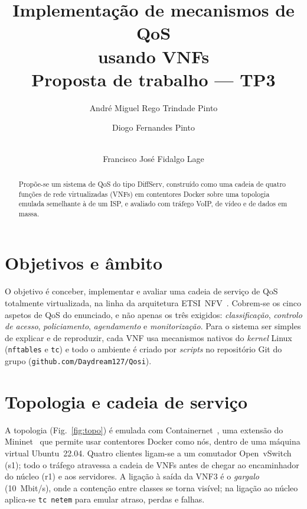 \documentclass[a4paper]{llncs}
\begin{document}
\title{Implementação de mecanismos de QoS\\ usando VNFs\\{\large Proposta de trabalho --- TP3}}

\author{André Miguel Rego Trindade Pinto \and Diogo Fernandes Pinto \and\\ Francisco José Fidalgo Lage}


\maketitle

\begin{abstract}
Propõe-se um sistema de QoS do tipo DiffServ, construído como uma cadeia de quatro
funções de rede virtualizadas (VNFs) em contentores Docker sobre uma topologia emulada
semelhante à de um ISP, e avaliado com tráfego VoIP, de vídeo e de dados em massa.
\end{abstract}

\section{Objetivos e âmbito}

O objetivo é conceber, implementar e avaliar uma cadeia de serviço de QoS totalmente
virtualizada, na linha da arquitetura ETSI~NFV~\cite{etsi-nfv}. Cobrem-se os cinco
aspetos de QoS do enunciado, e não apenas os três exigidos: \emph{classificação},
\emph{controlo de acesso}, \emph{policiamento}, \emph{agendamento} e
\emph{monitorização}. Para o sistema ser simples de explicar e de reproduzir, cada VNF
usa mecanismos nativos do \emph{kernel} Linux (\texttt{nftables} e \texttt{tc}) e todo
o ambiente é criado por \emph{scripts} no repositório Git do grupo
(\texttt{github.com/Daydream127/Qosi}).

\section{Topologia e cadeia de serviço}

A topologia (Fig.~\ref{fig:topo}) é emulada com Containernet~\cite{containernet}, uma
extensão do Mininet~\cite{mininet} que permite usar contentores Docker como nós, dentro
de uma máquina virtual Ubuntu~22.04. Quatro clientes ligam-se a um
comutador Open~vSwitch (s1); todo o tráfego atravessa a cadeia de VNFs antes de chegar
ao encaminhador do núcleo (r1) e aos servidores. A ligação à saída da VNF3 é o
\emph{gargalo} (10~Mbit/s), onde a contenção entre classes se torna visível; na ligação
ao núcleo aplica-se \texttt{tc netem} para emular atraso, perdas e falhas.
\end{document}
